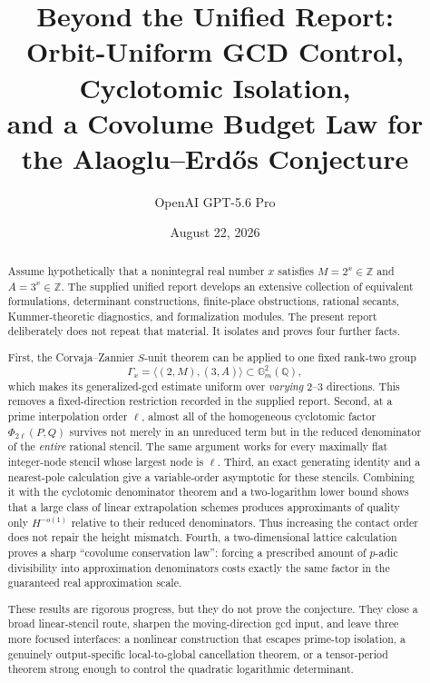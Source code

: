\documentclass[11pt]{article}
\title{\textbf{Beyond the Unified Report:}\\[3pt]
Orbit-Uniform GCD Control, Cyclotomic Isolation,\\
and a Covolume Budget Law for the Alaoglu--Erd\H{o}s Conjecture}
\author{OpenAI GPT-5.6 Pro}
\date{August 22, 2026}
\theoremstyle{definition}
\newcommand{\Z}{\mathbb Z}
\newcommand{\Q}{\mathbb Q}
\newcommand{\Gm}{\mathbb G_m}
\begin{document}
\maketitle

\begin{abstract}
Assume hypothetically that a nonintegral real number $x$ satisfies
$M=2^x\in\Z$ and $A=3^x\in\Z$.  The supplied unified report develops an
extensive collection of equivalent formulations, determinant constructions,
finite-place obstructions, rational secants, Kummer-theoretic diagnostics,
and formalization modules.  The present report deliberately does not repeat
that material.  It isolates and proves four further facts.

First, the Corvaja--Zannier $S$-unit theorem can be applied to one fixed
rank-two group
\[
 \Gamma_x=\langle(2,M),(3,A)\rangle\subset\Gm^2(\Q),
\]
which makes its generalized-gcd estimate uniform over \emph{varying}
$2$--$3$ directions.  This removes a fixed-direction restriction recorded in
the supplied report.  Second, at a prime interpolation order $\ell$, almost
all of the homogeneous cyclotomic factor
$\Phi_{2\ell}(P,Q)$ survives not merely in an unreduced term but in the
reduced denominator of the \emph{entire} rational stencil.  The same argument
works for every maximally flat integer-node stencil whose largest node is
$\ell$.  Third, an exact generating identity and a nearest-pole calculation
give a variable-order asymptotic for these stencils.  Combining it with the
cyclotomic denominator theorem and a two-logarithm lower bound shows that a
large class of linear extrapolation schemes produces approximants of quality
only $H^{-o(1)}$ relative to their reduced denominators.  Thus increasing the
contact order does not repair the height mismatch.  Fourth, a two-dimensional
lattice calculation proves a sharp ``covolume conservation law'': forcing a
prescribed amount of $p$-adic divisibility into approximation denominators
costs exactly the same factor in the guaranteed real approximation scale.

These results are rigorous progress, but they do not prove the conjecture.
They close a broad linear-stencil route, sharpen the moving-direction gcd
input, and leave three more focused interfaces: a nonlinear construction that
escapes prime-top isolation, a genuinely output-specific local-to-global
cancellation theorem, or a tensor-period theorem strong enough to control the
quadratic logarithmic determinant.
\end{abstract}
\end{document}
